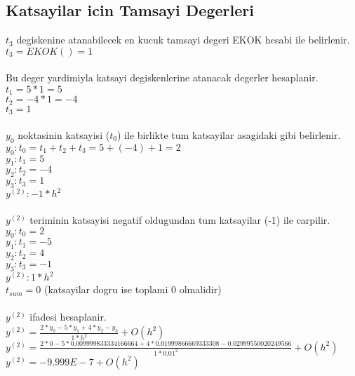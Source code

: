 \documentclass{article}
\begin{document}
\subsection{Katsayilar icin Tamsayi Degerleri}
$t_{3}$ degiskenine atanabilecek en kucuk tamsayi degeri EKOK hesabi ile belirlenir.\\
$t_{3}=EKOK()=1$\\
\\
Bu deger yardimiyla katsayi degiskenlerine atanacak degerler hesaplanir.\\
$\displaystyle t_{1}=5*1=5$\\
$\displaystyle t_{2}=-4*1=-4$\\
$\displaystyle t_{3}=1$\\
\\
$y_{0}$ noktasinin katsayisi ($t_{0}$) ile birlikte tum katsayilar asagidaki gibi belirlenir.\\
$y_{0}: t_{0}=t_{1}+t_{2}+t_{3}=5+(-4)+1=2$\\
$y_{1}: t_{1}=5$\\
$y_{2}: t_{2}=-4$\\
$y_{3}: t_{3}=1$\\
$y^{(2)}: -1*h^2$\\
\\
$y^{(2)}$ teriminin katsayisi negatif oldugundan tum katsayilar (-1) ile carpilir.\\
$y_{0}: t_{0}=2$\\
$y_{1}: t_{1}=-5$\\
$y_{2}: t_{2}=4$\\
$y_{3}: t_{3}=-1$\\
$y^{(2)}: 1*h^{2}$\\
$t_{sum} = 0$ (katsayilar dogru ise toplami 0 olmalidir)\\
\\
$y^{(2)}$ ifadesi hesaplanir.\\
$y^{(2)}=\frac{2*y_{0}-5*y_{1}+4*y_{2}-y_{3}}{1*h^{2}}+O(h^{2})$\\
$y^{(2)}=\frac{2*0-5*0.009999833334166664+4*0.01999866669333308-0.02999550020249566}{1*0.01^{2}}+O(h^{2})$\\
$y^{(2)}=-9.999E-7+O(h^{2})$\\
\end{document}
